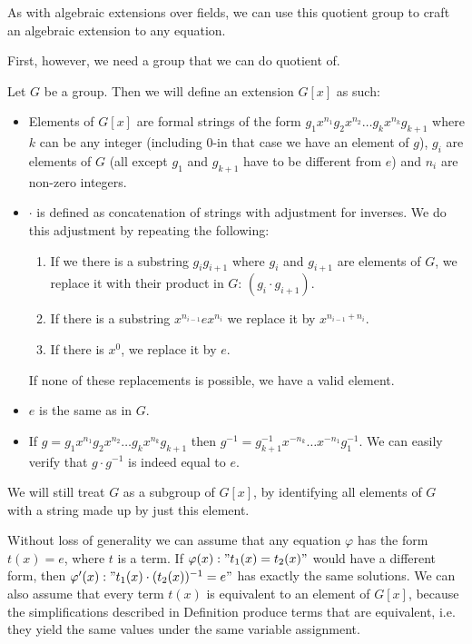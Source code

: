 As with algebraic extensions over fields, we can use this quotient group to craft an algebraic extension to any equation.

First, however, we need a group that we can do quotient of.

\begin{defn}
\label{freegroupdefn}
	Let $G$ be a group. Then we will define an extension $G[x]$ as such:
	\begin{itemize}
		\item Elements of $G[x]$ are formal strings of the form $g_1 x^{n_1}g_2 x^{n_2}\dots g_k x^{n_k}g_{k+1}$ where $k$ can be any integer (including $0$-in that case we have an element of $g$), $g_i$ are elements of $G$ (all except $g_1$ and $g_{k+1}$ have to be different from $e$) and $n_i$ are non-zero integers.
		\item $\cdot$ is defined as concatenation of strings with adjustment for inverses. We do this adjustment by repeating the following:
			\begin{enumerate}
				\item If we there is a substring $g_i g_{i+1}$ where $g_i$ and $g_{i+1}$ are elements of $G$, we replace it with their product in $G$: $(g_i\cdot g_{i+1})$.
				\item If there is a substring $x^{n_{i-1}}ex^{n_i}$ we replace it by $x^{n_{i-1}+n_i}$.
				\item If there is $x^0$, we replace it by $e$.			
			\end{enumerate}
			If none of these replacements is possible, we have a valid element.
	\item $e$ is the same as in $G$.
	\item If  $g=g_1 x^{n_1}g_2 x^{n_2}\dots g_k x^{n_k}g_{k+1}$ then $g^{-1}=g_{k+1}^{-1}x^{-n_k}\dots x^{-n_1}g_1^{-1}$. We can easily verify that $g\cdot g^{-1}$ is indeed equal to $e$.
	\end{itemize}
We will still treat $G$ as a subgroup of $G[x]$, by identifying all elements of $G$ with a string made up by just this element.
\end{defn}

Without loss of generality we can assume that any equation $\varphi$ has the form $t(x)=e$, where $t$ is a term. If $\varphi(x): "t_1(x)=t_2(x)"$ would have a different form, then $\varphi'(x): "t_1(x)\cdot (t_2(x))^{-1}=e"$ has exactly the same solutions. We can also assume that every term $t(x)$ is equivalent to an element of $G[x]$, because the simplifications described in Definition  produce terms that are equivalent, i.e. they yield the same values under the same variable assignment.

